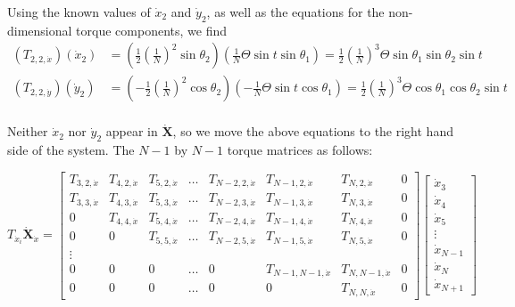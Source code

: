 \documentclass[12pt,letterpaper,titlepage]{article}
\begin{document}
Using the known values of $\dot{x}_2$ and $\dot{y}_2$, as well as the equations for the non-dimensional torque components, we find
\begin{align*}
(T_{2,2,\dot{x}}) (\dot{x}_2) &= (\frac{1}{2} (\frac{1}{N})^2 \sin \theta_2)(\frac{1}{N} \Theta \sin t \sin \theta_1) = \frac{1}{2}(\frac{1}{N})^3 \Theta \sin \theta_1 \sin \theta_2 \sin t\\
(T_{2,2,\dot{y}}) (\dot{y}_2) &= (- \frac{1}{2} (\frac{1}{N})^2 \cos \theta_2)(- \frac{1}{N} \Theta \sin t \cos \theta_1) = \frac{1}{2}(\frac{1}{N})^3 \Theta \cos \theta_1 \cos \theta_2 \sin t\\
\end{align*}

Neither $\dot{x}_2$ nor $\dot{y}_2$ appear in  $\mathbf{\dot{X}}$, so we move the above equations to the right hand side of the system. The $N-1$ by $N-1$ torque matrices as follows:

\[
T_{\dot{x}_i}\mathbf{\dot{X}}_{\dot{x}} = \begin{bmatrix}
T_{3,2,\dot{x}}&T_{4,2,\dot{x}}&T_{5,2,\dot{x}}&\hdots&T_{N-2,2,\dot{x}}&T_{N-1,2,\dot{x}}&T_{N,2,\dot{x}}&0\\
T_{3,3,\dot{x}}&T_{4,3,\dot{x}}&T_{5,3,\dot{x}}&\hdots&T_{N-2,3,\dot{x}}&T_{N-1,3,\dot{x}}&T_{N,3,\dot{x}}&0\\
0&T_{4,4,\dot{x}}&T_{5,4,\dot{x}}&\hdots&T_{N-2,4,\dot{x}}&T_{N-1,4,\dot{x}}&T_{N,4,\dot{x}}&0\\
0&0&T_{5,5,\dot{x}}&\hdots&T_{N-2,5,\dot{x}}&T_{N-1,5,\dot{x}}&T_{N,5,\dot{x}}&0\\
\vdots\\
0&0&0&\hdots&0&T_{N-1,N-1,\dot{x}}&T_{N,N-1,\dot{x}}&0\\
0&0&0&\hdots&0&0&T_{N,N,\dot{x}}&0
\end{bmatrix}
\begin{bmatrix}
\dot{x}_3\\
\dot{x}_4\\
\dot{x}_5\\
\vdots\\
\dot{x}_{N-1}\\
\dot{x}_{N}\\
\dot{x}_{N+1}
\end{bmatrix}
\]
\end{document}
